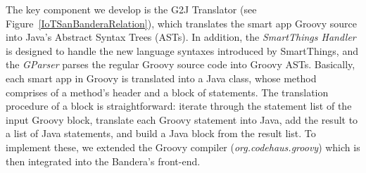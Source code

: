The key component we develop is the G2J Translator (see Figure~\ref{IoTSanBanderaRelation}),
which translates the smart app Groovy source into Java's Abstract Syntax Trees (ASTs).
In addition, the \textit{SmartThings Handler} is designed to handle the new language syntaxes introduced by SmartThings,
and the \textit{GParser} parses the regular Groovy source code into Groovy ASTs.
Basically, each smart app in Groovy is translated into a Java class,
whose method comprises of a method's header and a block of statements.
The translation procedure of a block is straightforward:
iterate through the statement list of the input Groovy block,
translate each Groovy statement into Java,
add the result to a list of Java statements,
and build a Java block from the result list.
To implement these,
we extended the Groovy compiler (\emph{org.codehaus.\allowbreak groovy})
which is then integrated into the Bandera's front-end.


